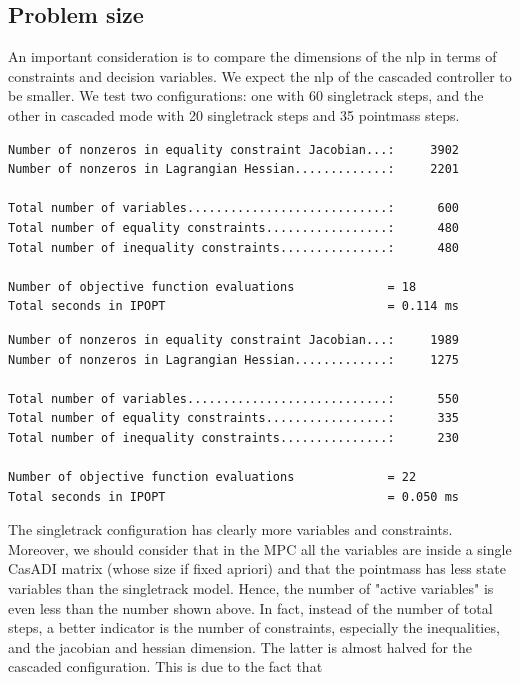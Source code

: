 \documentclass[a4paper, onecolumn, 12pt]{article}
\begin{document}
\subsection{Problem size}
An important consideration is to compare the dimensions of the nlp in terms of
constraints and decision variables. We expect the nlp of the cascaded
controller to be smaller. We test two configurations: one with 60 singletrack
steps, and the other in cascaded mode with 20 singletrack steps and 35 pointmass
steps. \\
\begin{Verbatim}[frame=single,label=Singletrack with 60 steps,labelposition=topline,framesep=10pt]
Number of nonzeros in equality constraint Jacobian...:     3902
Number of nonzeros in Lagrangian Hessian.............:     2201

Total number of variables............................:      600
Total number of equality constraints.................:      480
Total number of inequality constraints...............:      480

Number of objective function evaluations             = 18
Total seconds in IPOPT                               = 0.114 ms
\end{Verbatim} 
\vspace{1mm}
\begin{Verbatim}[frame=single,label=Cascaded with 20+35 steps,labelposition=topline,framesep=10pt]
Number of nonzeros in equality constraint Jacobian...:     1989
Number of nonzeros in Lagrangian Hessian.............:     1275

Total number of variables............................:      550
Total number of equality constraints.................:      335
Total number of inequality constraints...............:      230

Number of objective function evaluations             = 22
Total seconds in IPOPT                               = 0.050 ms
\end{Verbatim}
The singletrack configuration has clearly more variables and constraints.
Moreover, we should consider that in the MPC all the variables are inside a
single CasADI matrix (whose size if fixed apriori) and that the pointmass has
less state variables than the singletrack model. Hence, the number of "active
variables" is even less than the number shown above. In fact, instead of the
number of total steps, a better indicator is the number of constraints,
especially the inequalities, and the jacobian and hessian dimension. The latter
is almost halved for the cascaded configuration. This is due to the fact that
\end{document}
